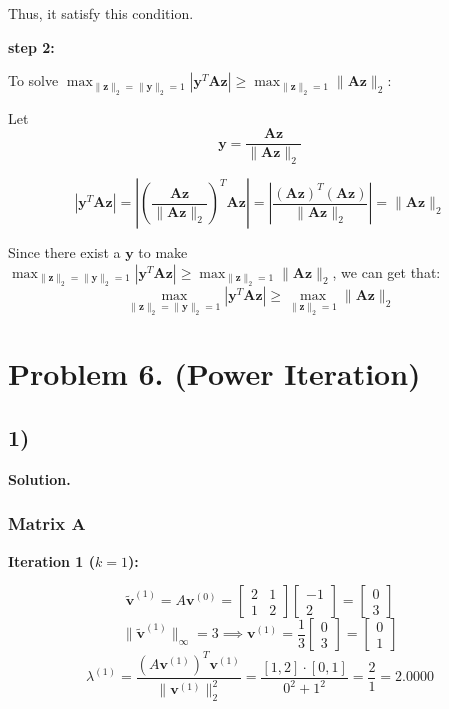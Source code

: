 \documentclass{article}
\newcommand{\y}{{\mathbf{y}}} %
\newcommand{\0}{{\mathbf{0}}} %
\begin{document}
Thus, it satisfy this condition.

\textbf{step 2:}

To solve $\max_{\|\mathbf{z}\|_2=\|\mathbf{y}\|_2=1} |\mathbf{y}^T \mathbf{A}\mathbf{z}| \geq \max_{\|\mathbf{z}\|_2=1} \|\mathbf{A}\mathbf{z}\|_2$:

Let $$\mathbf{y} = \frac{\mathbf{Az}}{\|\mathbf{Az}\|_2}$$

$$|\mathbf{y}^T \mathbf{Az}| = |\left(\frac{\mathbf{Az}}{\|\mathbf{Az}\|_2}\right)^T \mathbf{Az}| = |\frac{(\mathbf{Az})^T (\mathbf{Az})}{\|\mathbf{Az}\|_2}| = \|\mathbf{Az}\|_2$$

Since there exist a $\y$ to make $\max_{\|\mathbf{z}\|_2=\|\mathbf{y}\|_2=1} |\mathbf{y}^T \mathbf{A}\mathbf{z}| \geq \max_{\|\mathbf{z}\|_2=1} \|\mathbf{A}\mathbf{z}\|_2$, we can get that:
$$
\max_{\|\mathbf{z}\|_2=\|\mathbf{y}\|_2=1} |\mathbf{y}^T \mathbf{A}\mathbf{z}| \geq \max_{\|\mathbf{z}\|_2=1} \|\mathbf{A}\mathbf{z}\|_2
$$

\section*{Problem 6. (Power Iteration)}

\subsection*{1)}

\textbf{Solution.}

\subsubsection*{Matrix A}

\textbf{Iteration 1 ($k=1$):}

\[
\tilde{\mathbf{v}}^{(1)} = A \mathbf{v}^{(0)} =
\begin{bmatrix} 2 & 1 \\ 1 & 2
\end{bmatrix}
\begin{bmatrix} -1 \\ 2
\end{bmatrix} =
\begin{bmatrix} 0 \\ 3
\end{bmatrix}
\]
\[
\|\tilde{\mathbf{v}}^{(1)}\|_\infty = 3 \implies \mathbf{v}^{(1)} = \frac{1}{3}
\begin{bmatrix} 0 \\ 3
\end{bmatrix} =
\begin{bmatrix} 0 \\ 1
\end{bmatrix}
\]
\[
\lambda^{(1)} = \frac{(A\mathbf{v}^{(1)})^T \mathbf{v}^{(1)}}{\|\mathbf{v}^{(1)}\|_2^2} = \frac{[1, 2] \cdot [0, 1]}{0^2 + 1^2} = \frac{2}{1} = \mathbf{2.0000}
\]
\end{document}
